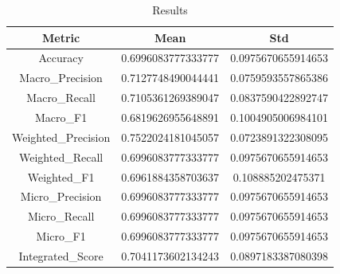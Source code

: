 \begin{table}[htbp]
\centering
\caption{Results}
\label{tab:csv}
\small
\setlength{\tabcolsep}{4pt}
\begin{tabular}{|c|c|c|}
\hline
Metric & Mean & Std \\
\hline
Accuracy & 0.6996083777333777 & 0.0975670655914653 \\
Macro_Precision & 0.7127748490044441 & 0.0759593557865386 \\
Macro_Recall & 0.7105361269389047 & 0.0837590422892747 \\
Macro_F1 & 0.6819626955648891 & 0.1004905006984101 \\
Weighted_Precision & 0.7522024181045057 & 0.0723891322308095 \\
Weighted_Recall & 0.6996083777333777 & 0.0975670655914653 \\
Weighted_F1 & 0.6961884358703637 & 0.108885202475371 \\
Micro_Precision & 0.6996083777333777 & 0.0975670655914653 \\
Micro_Recall & 0.6996083777333777 & 0.0975670655914653 \\
Micro_F1 & 0.6996083777333777 & 0.0975670655914653 \\
Integrated_Score & 0.7041173602134243 & 0.0897183387080398 \\
\hline
\end{tabular}
\end{table}